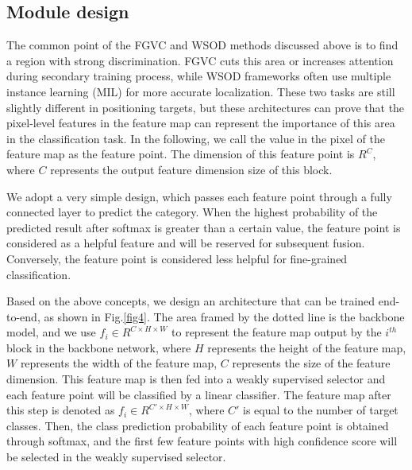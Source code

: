 \documentclass[conference]{IEEEtran}
\begin{document}
\subsection{Module design}
The common point of the FGVC and WSOD methods discussed above is to find a region with strong discrimination. FGVC cuts this area or increases attention during secondary training process, while WSOD frameworks often use multiple instance learning (MIL) for more accurate localization. These two tasks are still slightly different in positioning targets, but these architectures can prove that the pixel-level features in the feature map can represent the importance of this area in the classification task. In the following, we call the value in the pixel of the feature map as the feature point. The dimension of this feature point is $R^{C}$, where $C$ represents the output feature dimension size of this block.

We adopt a very simple design, which passes each feature point through a fully connected layer to predict the category. When the highest probability of the predicted result after softmax is greater than a certain value, the feature point is considered as a helpful feature and will be reserved for subsequent fusion. Conversely, the feature point is considered less helpful for fine-grained classification.

Based on the above concepts, we design an architecture that can be trained end-to-end, as shown in Fig.\ref{fig4}. The area framed by the dotted line is the backbone model, and we use $f_{i} \in R^{C\times H\times W}$ to represent the feature map output by the $i^{th}$ block in the backbone network, where $H$ represents the height of the feature map, $W$ represents the width of the feature map, $C$ represents the size of the feature dimension. This feature map is then fed into a weakly supervised selector and each feature point will be classified by a linear classifier. The feature map after this step is denoted as $f_{i} \in R^{C\prime\times H\times W}$, where $C\prime$ is equal to the number of target classes. Then, the class prediction probability of each feature point is obtained through softmax, and the first few feature points with high confidence score will be selected in the weakly supervised selector.
\end{document}
